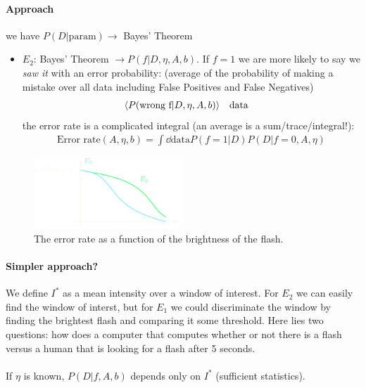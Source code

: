 \documentclass[../main.tex]{subfiles}
\begin{document}
\paragraph*{Approach} we have $P(D|\text{param}) \to$ Bayes' Theorem
\begin{itemize}
    \item $E_2$: Bayes' Theorem $\to P(f|D, \eta, A, b)$. If $f=1$ we are more likely to say we
    \emph{saw it} with an error probability: (average of the probability of making a mistake over
    all data including False Positives and False Negatives)
    \begin{align*}
        \langle P(\textrm{wrong f}|D, \eta, A, b) \rangle \qqtext{data}
    \end{align*}
    the error rate is a complicated integral (an average is a sum/trace/integral!): 
    \begin{align*}
        \textrm{Error rate}(A, \eta, b) = \int \dd{\text{data}} P(f=1|D) P(D|f=0,A,\eta)
    \end{align*}
\end{itemize}
\begin{figure}[ht]
    \centering
    \includegraphics[width=0.5\textwidth]{vmodel1.png}
    \caption{The error rate as a function of the brightness of the flash.}
    \label{fig:flash3}
\end{figure}

\paragraph*{Simpler approach?} We define $I^*$ as a mean intensity over a window of interest. 
For $E_2$ we can easily find the window of interst, but for $E_1$ we could discriminate the window
by finding the brightest flash and comparing it some threshold. Here lies two questions: how does a
computer that computes whether or not there is a flash versus a human that is looking for a flash
after 5 seconds.

\paragraph*{} If $\eta$ is known, $P(D|f,A,b)$ depends only on $I^*$ (sufficient statistics).
\end{document}
